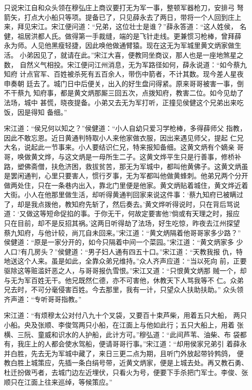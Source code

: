 只说宋江自和众头领在穆弘庄上商议要打无为军一事，整顿军器枪刀，安排弓
弩箭矢，打点大小船只等项。提备已了，只见薛永去了两日，带将一个人回到庄上
来，拜见宋江。宋江便问道：“兄弟，这位壮士是谁？”薛永答道：“这人姓侯，
名健，祖居洪都人氏。做得第一手裁缝，端的是飞针走线。更兼惯习枪棒，曾拜薛
永为师。人见他黑瘦轻捷，因此唤他做通臂猿。现在这无为军城里黄文炳家做生活。
小弟因见了，就请在此。”宋江大喜，便教同坐商议，那人也是一座地煞星之数，
自然义气相投。宋江便问江州消息，无为军路径如何，薛永说道：“如今蔡九知府
计点官军、百姓被杀死有五百余人，带伤中箭者，不计其数。现今差人星夜申奏朝
廷去了。城门日中后便关，出入的好生盘问得紧。原来哥哥被害一事，倒不干蔡九
知府事，都是黄文炳那厮三回五次，点拨知府，教害二位。如今见劫了法场，城中
甚慌，晓夜提备。小弟又去无为军打听，正撞见侯健这个兄弟出来吃饭，因是得知
备细。”

宋江道：“侯兄何以知之？”侯健道：“小人自幼只爱习学枪棒，多得薛师父
指教，因此不敢忘恩。近日黄通判特取小人来他家做衣服，因出来遇见师父，提起
仁兄大名，说起此一节事来。小人要结识仁兄，特来报知备细。这黄文炳有个嫡亲
哥哥，唤做黄文烨，与这文炳是一母所生二子。这黄文烨平生只是行善事，修桥补
路，塑佛斋僧，扶危济困，救拔贫苦，那无为军城中，都叫他黄佛子。这黄文炳虽
是罢闲通判，心里只要害人，惯行歹事，无为军都叫他做黄蜂刺。他弟兄两个分开
做两处住，只在一条巷内出入，靠北门里便是他家。黄文炳贴着城住，黄文烨近着
大街。小人在他那里做生活，却听得黄通判回家来说这件事：‘蔡九知府已被瞒过
了，却是我点拨他，教知府先斩了，然后奏去。’黄文烨听得说时，只在背后骂说
道：‘又做这等短命促掐的事。于你无干，何故定要害他?倘或有天理之时，报应
只在目前，却不是反招其祸。’这两日听得劫了法场，好生吃惊，昨夜去江州探望
蔡九知府，与他计较，尚兀自未回来。”宋江道：“黄文炳隔着他哥哥家多少路？”
侯健道：“原是一家分开的，如今只隔着中间一个菜园。”宋江道：“黄文炳家多
少人口?有几房头？”侯健道：“男子妇人通有四五十口。”宋江道：“天教我报
仇，特地送这个人来。虽是如此，全靠众弟兄维持。”众人齐声应道：“当以死向
前，正要驱除这等赃滥奸恶之人，与哥哥报仇雪恨。”宋江又道：“只恨黄文炳那
贼一个，却与无为军百姓无干。他兄既然仁德，亦不可害他，休教天下人骂我等不
仁。众弟兄去时，不可分毫侵害百姓。今去那里，我有一计，只望众人扶助扶助。”
众头领齐声道：“专听哥哥指教。”

宋江道：“有烦穆太公对付八九十个叉袋，又要百十束芦柴，用着五只大船，
两只小船。央及张顺、李俊驾两只小船，在江面上与他如此行；五只大船上，用着
张横、三阮、童威和识水的人护船，此计方可。”穆弘道：“此间芦苇、油柴、布
袋都有，我庄上的人都会使水驾船，便请哥哥行事。”宋江道：“却用侯家兄弟引
着薛永并白胜，先去无为军城中藏了，来日三更二点为期，且听门外放起带铃鹁鸽，
便教白胜上城策应，先插一条白绢号带，近黄文炳家，便是上城去处。再又教石勇、
杜迁扮做丐者，去城门边左近埋伏，只看火为号，便要下手杀把门军士。李俊、张
顺只在江面上往来巡绰，等候策应。”


